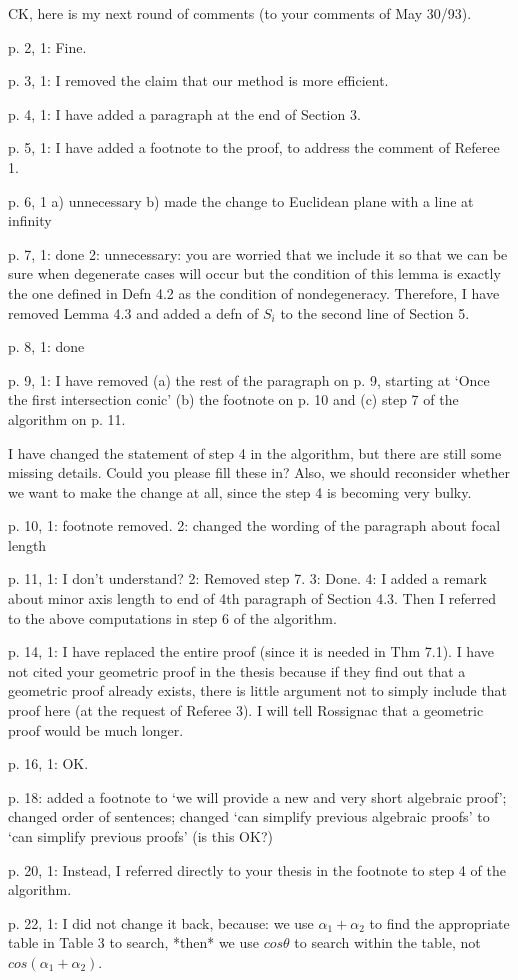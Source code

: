 CK, here is my next round of comments (to your comments of May 30/93).

p. 2, 1: Fine.

p. 3, 1: I removed the claim that our method is more efficient.

p. 4, 1: I have added a paragraph at the end of Section 3.

p. 5, 1: I have added a footnote to the proof, to address the comment
	of Referee 1.

p. 6, 1 a) unnecessary
	b) made the change to Euclidean plane with a line at infinity

p. 7, 1: done
      2: unnecessary: you are worried that we include it 
	so that we can be sure when degenerate cases will occur
	but the condition of this lemma is exactly the one defined
	in Defn 4.2 as the condition of nondegeneracy.
	Therefore, I have removed Lemma 4.3 and added a defn of $S_i$	
	to the second line of Section 5. 

p. 8, 1: done

p. 9, 1: I have removed (a) the rest of the paragraph on p. 9, 
	starting at `Once the first intersection conic'
			(b) the footnote on p. 10
		    and (c) step 7 of the algorithm on p. 11.

	I have changed the statement of step 4 in the algorithm, 
	but there are still some missing details.
	Could you please fill these in?
	Also, we should reconsider whether we want to make the change
	at all, since the step 4 is becoming very bulky.

p. 10, 	1: footnote removed.
	2: changed the wording of the paragraph about focal length
	
p. 11,  1: I don't understand?
	2: Removed step 7.
	3: Done.
	4: I added a remark about minor axis length to end of 4th paragraph
	   of Section 4.3.
	   Then I referred to the above computations in step 6 of
	   the algorithm.

p. 14, 1: I have replaced the entire proof (since it is needed in Thm 7.1).
	I have not cited your geometric proof in the thesis because
	if they find out that a geometric proof already exists, there
	is little argument not to simply include that proof here
	(at the request of Referee 3).
	I will tell Rossignac that a geometric proof would be much longer.

p. 16, 1: OK.

p. 18: added a footnote to `we will provide a new and very short algebraic
	proof'; changed order of sentences; changed 
	`can simplify previous algebraic proofs' to 
	`can simplify previous proofs' (is this OK?)

p. 20, 1: Instead, I referred directly to your thesis in the footnote
	to step 4 of the algorithm.

p. 22, 1: I did not change it back, because: 
	we use $\alpha_1 + \alpha_2$ to find the appropriate table
	in Table 3 to search, *then* we use $cos \theta$ to search within
	the table, not $cos (\alpha_1 + \alpha_2)$.




	





